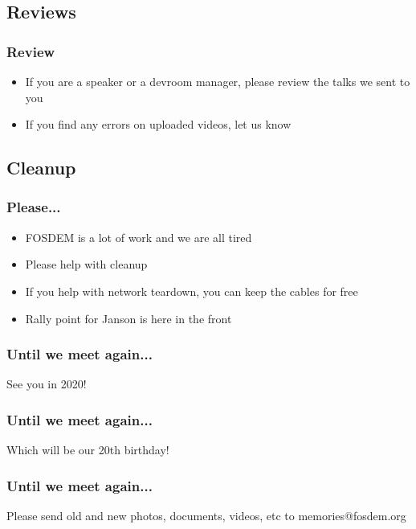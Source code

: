 \documentclass[aspectratio=169]{beamer}
\begin{document}
\subsection{Reviews}

\begin{frame}
	\frametitle{Review}
	\vfill
	\begin{itemize}
		\item If you are a speaker or a devroom manager, please review the talks we sent to you
		\item If you find any errors on uploaded videos, let us know
	\end{itemize}
	\vfill
\end{frame}

\subsection{Cleanup}

\begin{frame}
	\frametitle{Please...}
	\vfill
	\begin{itemize}
		\item FOSDEM is a lot of work and we are all tired
		\item Please help with cleanup
		\item If you help with network teardown, you can keep the cables for free
		\item Rally point for Janson is here in the front
	\end{itemize}
	\vfill
\end{frame}

\begin{frame}
	\frametitle{Until we meet again...}
	\vfill
	\begin{center}
		{\Huge See you in 2020!}
	\end{center}
	\vfill
\end{frame}

\begin{frame}
	\frametitle{Until we meet again...}
	\vfill
	\begin{center}
		{\Huge Which will be our 20th birthday!}
	\end{center}
	\vfill
\end{frame}

\begin{frame}
	\frametitle{Until we meet again...}
	\vfill
	\begin{center}
		{\Huge Please send old and new photos, documents, videos, etc to memories@fosdem.org}
	\end{center}
	\vfill
\end{frame}
\end{document}
